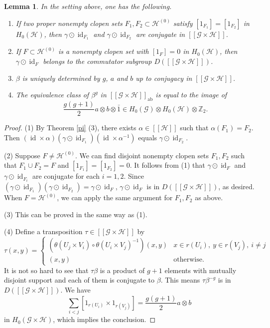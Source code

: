 \documentclass[11pt]{article}
\newtheorem{lemma}[theorem]{Lemma}
\theoremstyle{definition}
\numberwithin{equation}{section}
\newcommand{\id}{\operatorname{id}}
\newcommand{\ab}{\mathrm{ab}}
\newcommand{\G}{\mathcal{G}}
\renewcommand{\H}{\mathcal{H}}
\newcommand{\Z}{\mathbb{Z}}
\begin{document}
\begin{lemma}\label{baker}
In the setting above, one has the following. 
\begin{enumerate}
\item If two proper nonempty clopen sets $F_1,F_2\subset\H^{(0)}$ satisfy 
$[1_{F_1}]=[1_{F_2}]$ in $H_0(\H)$, then 
$\gamma\odot\id_{F_1}$ and $\gamma\odot\id_{F_2}$ are conjugate 
in $[[\G\times\H]]$. 
\item If $F\subset\H^{(0)}$ is a nonempty clopen set 
with $[1_F]=0$ in $H_0(\H)$, then $\gamma\odot\id_F$ belongs to 
the commutator subgroup $D([[\G\times\H]])$. 
\item $\beta$ is uniquely determined by $g$, $a$ and $b$ 
up to conjugacy in $[[\G\times\H]]$. 
\item The equivalence class of $\beta^g$ in $[[\G\times\H]]_\ab$ is 
equal to the image of 
\[
\frac{g(g+1)}{2}a\otimes b\otimes\bar{1}
\in H_0(\G)\otimes H_0(\H)\otimes\Z_2. 
\]
\end{enumerate}
\end{lemma}
\begin{proof}
(1)
By Theorem \ref{pi} (3), 
there exists $\alpha\in[[\H]]$ such that $\alpha(F_1)=F_2$. 
Then $(\id\times\alpha)(\gamma\odot\id_{F_1})(\id\times\alpha^{-1})$ 
equals $\gamma\odot\id_{F_2}$. 

(2)
Suppose $F\neq\H^{(0)}$. 
We can find disjoint nonempty clopen sets $F_1,F_2$ 
such that $F_1\cup F_2=F$ and $[1_{F_1}]=[1_{F_2}]=0$. 
It follows from (1) that 
$\gamma\odot\id_F$ and $\gamma\odot\id_{F_i}$ are conjugate 
for each $i=1,2$. 
Since $(\gamma\odot\id_{F_1})(\gamma\odot\id_{F_2})=\gamma\odot\id_F$, 
$\gamma\odot\id_F$ is in $D([[\G\times\H]])$, as desired. 
When $F=\H^{(0)}$, 
we can apply the same argument for $F_1,F_2$ as above. 

(3)
This can be proved in the same way as (1). 

(4)
Define a transposition $\tau\in[[\G\times\H]]$ by 
\[
\tau(x,y)=\begin{cases}
\left(\theta(U_j\times V_i)\circ\theta(U_i\times V_j)^{-1}\right)(x,y)
&x\in r(U_i),\ y\in r(V_j),\ i\neq j\\
(x,y)&\text{otherwise. }\end{cases}
\]
It is not so hard to see that 
$\tau\beta$ is a product of $g{+}1$ elements with mutually disjoint support 
and each of them is conjugate to $\beta$. 
This means $\tau\beta^{-g}$ is in $D([[\G\times\H]])$. 
We have 
\[
\sum_{i<j}[1_{r(U_i)}\times1_{r(V_j)}]=\frac{g(g+1)}{2}a\otimes b
\]
in $H_0(\G\times\H)$, which implies the conclusion. 
\end{proof}
\end{document}
